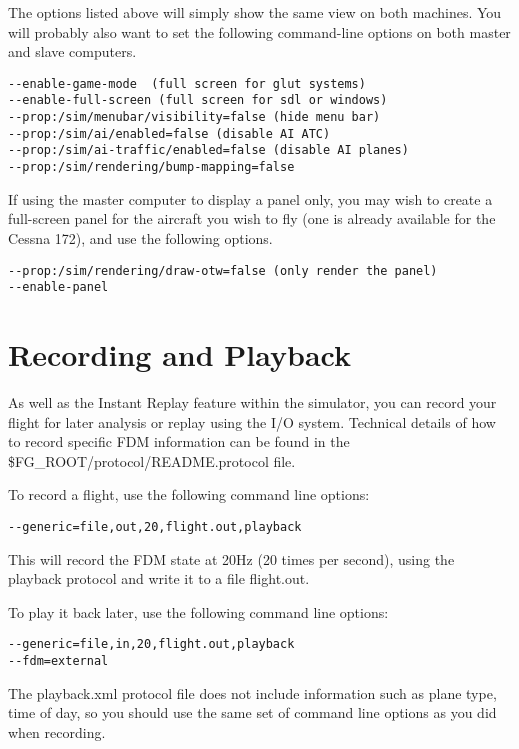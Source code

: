 The options listed above will simply show the same view on both machines. You will probably also want to set the
following command-line options on both master and slave computers.

\begin{verbatim}
--enable-game-mode  (full screen for glut systems)
--enable-full-screen (full screen for sdl or windows)
--prop:/sim/menubar/visibility=false (hide menu bar)
--prop:/sim/ai/enabled=false (disable AI ATC)
--prop:/sim/ai-traffic/enabled=false (disable AI planes)
--prop:/sim/rendering/bump-mapping=false
\end{verbatim}

If using the master computer to display a panel only, you may wish to create a full-screen panel for the
aircraft you wish to fly (one is already available for the Cessna 172), and use the following options.

\begin{verbatim}
--prop:/sim/rendering/draw-otw=false (only render the panel)
--enable-panel
\end{verbatim}

\section{Recording and Playback}

As well as the Instant Replay feature within the simulator, you can record your
flight for later analysis or replay using the I/O system.  Technical details of
how to record specific FDM information can be found in the
\$FG\_ROOT/protocol/README.protocol file.

To record a flight, use the following command line options:

\begin{verbatim}
--generic=file,out,20,flight.out,playback
\end{verbatim}

This will record the FDM state at 20Hz (20 times per second), using the playback
protocol and write it to a file flight.out.

To play it back later, use the following command line options:

\begin{verbatim}
--generic=file,in,20,flight.out,playback
--fdm=external
\end{verbatim}

The playback.xml protocol file does not include information such as plane type,
time of day, so you should use the same set of command line options as you
did when recording.

